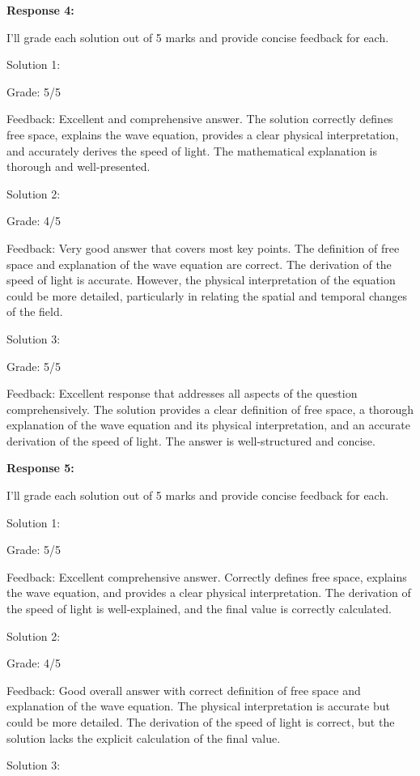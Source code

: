 \documentclass[a4paper,11pt]{article}
\begin{document}
\bigskip
\textbf{Response 4:}

I'll grade each solution out of 5 marks and provide concise feedback for each.

Solution 1:

Grade: 5/5

Feedback: Excellent and comprehensive answer. The solution correctly defines free space, explains the wave equation, provides a clear physical interpretation, and accurately derives the speed of light. The mathematical explanation is thorough and well-presented.

Solution 2:

Grade: 4/5

Feedback: Very good answer that covers most key points. The definition of free space and explanation of the wave equation are correct. The derivation of the speed of light is accurate. However, the physical interpretation of the equation could be more detailed, particularly in relating the spatial and temporal changes of the field.

Solution 3:

Grade: 5/5

Feedback: Excellent response that addresses all aspects of the question comprehensively. The solution provides a clear definition of free space, a thorough explanation of the wave equation and its physical interpretation, and an accurate derivation of the speed of light. The answer is well-structured and concise.

\bigskip
\textbf{Response 5:}

I'll grade each solution out of 5 marks and provide concise feedback for each.

Solution 1:

Grade: 5/5

Feedback: Excellent comprehensive answer. Correctly defines free space, explains the wave equation, and provides a clear physical interpretation. The derivation of the speed of light is well-explained, and the final value is correctly calculated.

Solution 2:

Grade: 4/5

Feedback: Good overall answer with correct definition of free space and explanation of the wave equation. The physical interpretation is accurate but could be more detailed. The derivation of the speed of light is correct, but the solution lacks the explicit calculation of the final value.

Solution 3:
\end{document}
